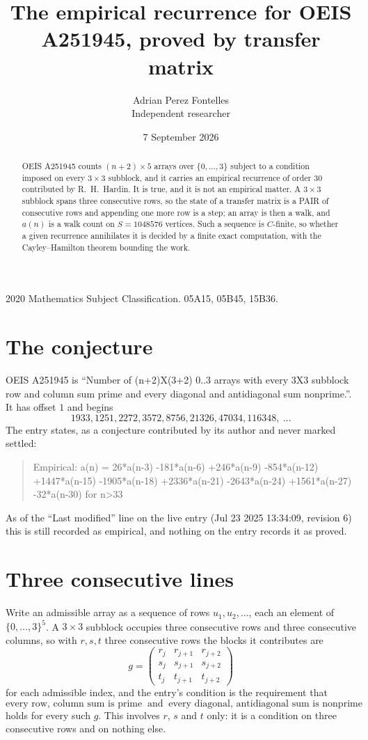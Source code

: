 \documentclass[11pt,a4paper]{article}
\title{The empirical recurrence for OEIS A251945, proved by transfer matrix}
\author{Adrian Perez Fontelles\\ \small Independent researcher}
\date{7 September 2026}
\theoremstyle{plain}
\theoremstyle{definition}
\begin{document}
\maketitle

\begin{abstract}
OEIS A251945 counts $(n+2)\times5$ arrays over $\{0,\dots,3\}$ subject to a condition imposed on
every $3\times3$ subblock, and it carries an empirical recurrence of order $30$
contributed by R.~H.~Hardin. It is true, and it is not an empirical matter. A $3\times3$
subblock spans three consecutive rows, so the state of a transfer matrix is a PAIR of
consecutive rows and appending one more row is a step; an array is then a walk, and
$a(n)$ is a walk count on $S=1048576$ vertices. Such a sequence is $C$-finite, so whether a given
recurrence annihilates it is decided by a finite exact computation, with the Cayley--Hamilton
theorem bounding the work.
\end{abstract}

\noindent\small 2020 Mathematics Subject Classification. 05A15, 05B45, 15B36.\normalsize

\section{The conjecture}

OEIS A251945 is ``Number of (n+2)X(3+2) 0..3 arrays with every 3X3 subblock row and column sum prime and every diagonal and antidiagonal sum nonprime.''. It has offset $1$ and begins
\[
1933, 1251, 2272, 3572, 8756, 21326, 47034, 116348,\ \dots
\]
The entry states, as a conjecture contributed by its author and never marked settled:
\begin{quote}
Empirical: a(n) = 26*a(n-3) -181*a(n-6) +246*a(n-9) -854*a(n-12) +1447*a(n-15) -1905*a(n-18) +2336*a(n-21) -2643*a(n-24) +1561*a(n-27) -32*a(n-30) for n>33
\end{quote}
As of the ``Last modified'' line on the live entry (Jul 23 2025 13:34:09, revision 6) this is still
recorded as empirical, and nothing on the entry records it as proved.

\section{Three consecutive lines}

Write an admissible array as a sequence of rows $u_1,u_2,\dots$, each an element of
$\{0,\dots,3\}^{5}$. A $3\times3$ subblock occupies three consecutive rows and
three consecutive columns, so with $r,s,t$ three consecutive rows the blocks it
contributes are
\[
g=\begin{pmatrix}r_j&r_{j+1}&r_{j+2}\\ s_j&s_{j+1}&s_{j+2}\\ t_j&t_{j+1}&t_{j+2}\end{pmatrix}
\]
for each admissible index, and the entry's condition is the requirement that
\[
\text{every row, column sum is prime}\ \text{ and }\ \text{every diagonal, antidiagonal sum is nonprime}
\]
holds for every such $g$. This involves $r$, $s$ and $t$ only: it is a condition on
three consecutive rows and on nothing else.
\end{document}
